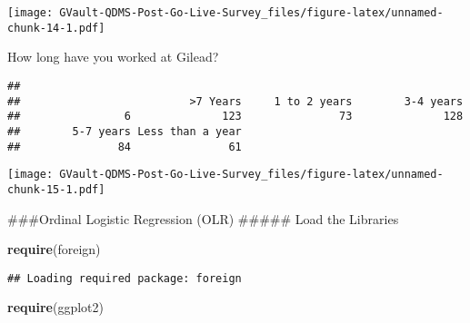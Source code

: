 \documentclass[
]{article}
\newenvironment{Shaded}{\begin{snugshade}}{\end{snugshade}}
\newcommand{\DataTypeTok}[1]{\textcolor[rgb]{0.13,0.29,0.53}{#1}}
\newcommand{\DecValTok}[1]{\textcolor[rgb]{0.00,0.00,0.81}{#1}}
\newcommand{\FloatTok}[1]{\textcolor[rgb]{0.00,0.00,0.81}{#1}}
\newcommand{\KeywordTok}[1]{\textcolor[rgb]{0.13,0.29,0.53}{\textbf{#1}}}
\newcommand{\NormalTok}[1]{#1}
\newcommand{\OperatorTok}[1]{\textcolor[rgb]{0.81,0.36,0.00}{\textbf{#1}}}
\newcommand{\StringTok}[1]{\textcolor[rgb]{0.31,0.60,0.02}{#1}}
\begin{document}
\texttt{[image: GVault-QDMS-Post-Go-Live-Survey\_files/figure-latex/unnamed-chunk-14-1.pdf]}

How long have you worked at Gilead?

\begin{Shaded}
\end{Shaded}

\begin{verbatim}
## 
##                          >7 Years     1 to 2 years        3-4 years 
##                6              123               73              128 
##        5-7 years Less than a year 
##               84               61
\end{verbatim}

\begin{Shaded}
\end{Shaded}

\texttt{[image: GVault-QDMS-Post-Go-Live-Survey\_files/figure-latex/unnamed-chunk-15-1.pdf]}

\#\#\#Ordinal Logistic Regression (OLR) \#\#\#\#\# Load the Libraries

\begin{Shaded}
\begin{Highlighting}[]
\KeywordTok{require}\NormalTok{(foreign)}
\end{Highlighting}
\end{Shaded}

\begin{verbatim}
## Loading required package: foreign
\end{verbatim}

\begin{Shaded}
\begin{Highlighting}[]
\KeywordTok{require}\NormalTok{(ggplot2)}
\end{Highlighting}
\end{Shaded}
\end{document}
